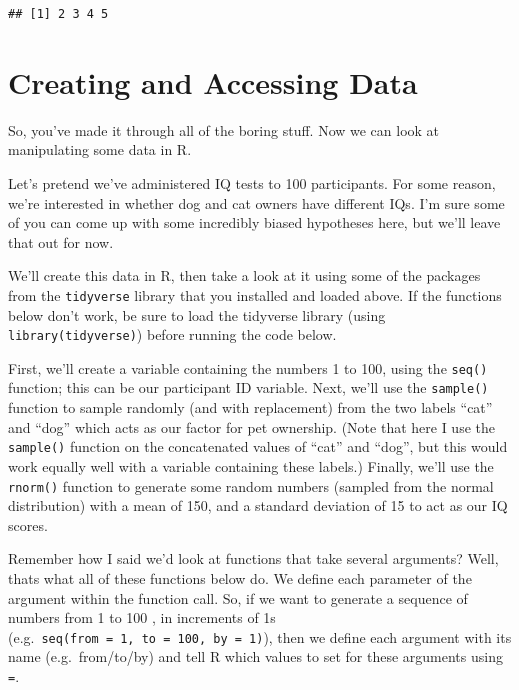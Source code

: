 \documentclass[
]{book}
\begin{document}
\begin{verbatim}
## [1] 2 3 4 5
\end{verbatim}

\hypertarget{creating-and-accessing-data}{%
\section{Creating and Accessing Data}\label{creating-and-accessing-data}}

So, you've made it through all of the boring stuff. Now we can look at manipulating some data in R.

Let's pretend we've administered IQ tests to 100 participants. For some reason, we're interested in whether dog and cat owners have different IQs. I'm sure some of you can come up with some incredibly biased hypotheses here, but we'll leave that out for now.

We'll create this data in R, then take a look at it using some of the packages from the \texttt{tidyverse} library that you installed and loaded above. If the functions below don't work, be sure to load the tidyverse library (using \texttt{library(tidyverse)}) before running the code below.

First, we'll create a variable containing the numbers 1 to 100, using the \texttt{seq()} function; this can be our participant ID variable. Next, we'll use the \texttt{sample()} function to sample randomly (and with replacement) from the two labels ``cat'' and ``dog'' which acts as our factor for pet ownership. (Note that here I use the \texttt{sample()} function on the concatenated values of ``cat'' and ``dog'', but this would work equally well with a variable containing these labels.) Finally, we'll use the \texttt{rnorm()} function to generate some random numbers (sampled from the normal distribution) with a mean of 150, and a standard deviation of 15 to act as our IQ scores.

Remember how I said we'd look at functions that take several arguments? Well, thats what all of these functions below do. We define each parameter of the argument within the function call. So, if we want to generate a sequence of numbers from 1 to 100 , in increments of 1s (e.g.~\texttt{seq(from\ =\ 1,\ to\ =\ 100,\ by\ =\ 1)}), then we define each argument with its name (e.g.~from/to/by) and tell R which values to set for these arguments using \texttt{=}.
\end{document}
